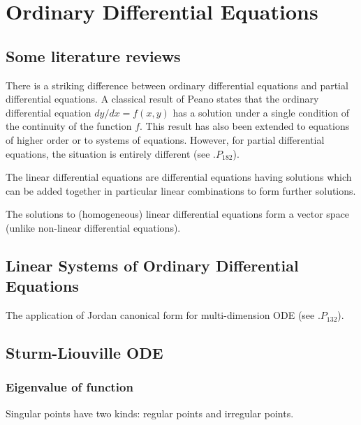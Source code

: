 \chapter{Ordinary Differential Equations}

\section{Some literature reviews}

There is a striking difference between ordinary differential equations and partial differential equations. A classical result of Peano states that the ordinary differential equation $dy/dx = f(x,y)$ has a solution under a single condition of the continuity of the function $f$. This result has also been extended to equations of higher order or to systems of equations. However, for partial differential equations, the situation is entirely different (see \cite{Yoshida_1980}.$P_{182}$).

\begin{definition}\label{def:linear_differentia_ equation}
The linear differential equations are differential equations having solutions which can be added together in particular linear combinations to form further solutions.

The solutions to (homogeneous) linear differential equations form a vector space (unlike non-linear differential equations).
\end{definition}

\section{Linear Systems of Ordinary Differential Equations}

The application of Jordan canonical form for multi-dimension ODE (see \cite{Horn_Johnson_1990}.$P_{132}$).



\section{Sturm-Liouville ODE}

\subsection{Eigenvalue of function}

Singular points have two kinds: regular points and irregular points.

